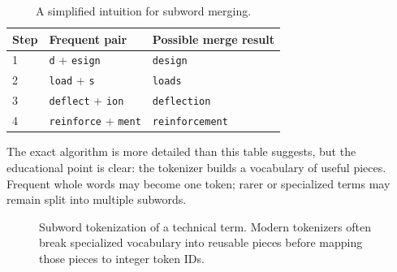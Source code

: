 \documentclass[12pt]{article}
\begin{document}
\begin{table}[ht]
    \centering
    \caption{A simplified intuition for subword merging.}
    \label{t15tab:bpe}
    \begin{tabular}{lll}
        \toprule
        \textbf{Step} & \textbf{Frequent pair} & \textbf{Possible merge result} \\
        \midrule
        1 & \texttt{d} + \texttt{esign} & \texttt{design} \\
        2 & \texttt{load} + \texttt{s} & \texttt{loads} \\
        3 & \texttt{deflect} + \texttt{ion} & \texttt{deflection} \\
        4 & \texttt{reinforce} + \texttt{ment} & \texttt{reinforcement} \\
        \bottomrule
    \end{tabular}
\end{table}

The exact algorithm is more detailed than this table suggests, but the educational point is clear: the tokenizer builds a vocabulary of useful pieces. Frequent whole words may become one token; rarer or specialized terms may remain split into multiple subwords.

\begin{figure}[ht]
    \centering
    \caption{Subword tokenization of a technical term. Modern tokenizers often break specialized vocabulary into reusable pieces before mapping those pieces to integer token IDs.}
    \label{t15fig:tokenization_schematic}
\end{figure}
\end{document}
